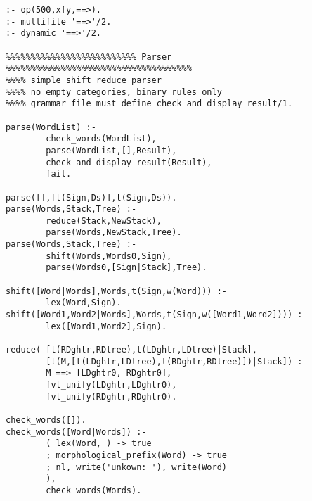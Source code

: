 \begin{verbatim}
:- op(500,xfy,==>).
:- multifile '==>'/2.
:- dynamic '==>'/2.

%%%%%%%%%%%%%%%%%%%%%%%%%% Parser %%%%%%%%%%%%%%%%%%%%%%%%%%%%%%%%%%%%%
%%%% simple shift reduce parser
%%%% no empty categories, binary rules only
%%%% grammar file must define check_and_display_result/1.

parse(WordList) :-
        check_words(WordList),
        parse(WordList,[],Result),
        check_and_display_result(Result),
        fail.

parse([],[t(Sign,Ds)],t(Sign,Ds)).
parse(Words,Stack,Tree) :-
        reduce(Stack,NewStack),
        parse(Words,NewStack,Tree).
parse(Words,Stack,Tree) :-
        shift(Words,Words0,Sign),
        parse(Words0,[Sign|Stack],Tree).

shift([Word|Words],Words,t(Sign,w(Word))) :-
        lex(Word,Sign).
shift([Word1,Word2|Words],Words,t(Sign,w([Word1,Word2]))) :-
        lex([Word1,Word2],Sign).
        
reduce( [t(RDghtr,RDtree),t(LDghtr,LDtree)|Stack],
        [t(M,[t(LDghtr,LDtree),t(RDghtr,RDtree)])|Stack]) :-
        M ==> [LDghtr0, RDghtr0],
        fvt_unify(LDghtr,LDghtr0),
        fvt_unify(RDghtr,RDghtr0).

check_words([]).
check_words([Word|Words]) :-
        ( lex(Word,_) -> true
        ; morphological_prefix(Word) -> true
        ; nl, write('unkown: '), write(Word)
        ), 
        check_words(Words).
\end{verbatim}
